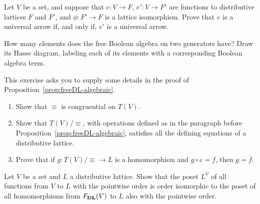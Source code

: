 \exercise\label{exe:universal-preserved-by-iso}
Let $V$ be a set, and suppose that $e \colon V \to F$, $e' \colon V \to F'$ are functions to distributive lattices $F$ and $F'$, and $\phi \colon F' \to F$ is a lattice isomorphism. Prove that $e$ is a universal arrow if, and only if, $e'$ is a universal arrow.

\exercise\label{exe:freeBA-on-2}
How many elements does the free Boolean algebra on two generators have? Draw its Hasse diagram, labeling each of its elements with a corresponding Boolean algebra term.


\begin{exercise}\label{exe:freeDL-algebraic}
  This exercise asks you to supply some details in the proof of Proposition~\ref{prop:freeDL-algebraic}.
  \begin{enumerate}
    \item Show that $\equiv$ is congruential on $T(V)$.
    \item Show that $T(V)/{\equiv}$, with operations defined as in the paragraph before Proposition~\ref{prop:freeDL-algebraic}, satisfies all the defining equations of a distributive lattice. 
    \item Prove that if $g \colon T(V)/{\equiv} \to L$ is a homomorphism and $g \circ e = f$, then $g = \bar{f}$.
  \end{enumerate}
\end{exercise}

\begin{exercise}\label{exe:Vto2}
Let $V$ be a set and $L$ a distributive lattice. Show that the poset $L^V$ of all functions from $V$ to $L$ with the pointwise order is order isomorphic to the poset of all homomorphisms from $F_{\mathbf{DL}}(V)$ to $L$ also with the pointwise order.
\end{exercise}

